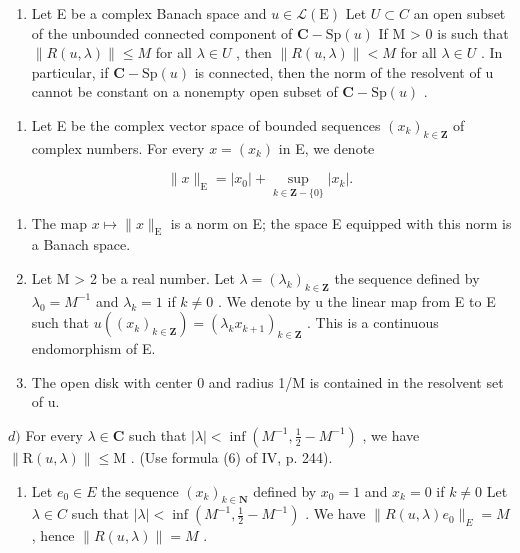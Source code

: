 \begin{enumerate}
\def\labelenumi{\alph{enumi})}
\setcounter{enumi}{1}
\tightlist
\item
  Let E be a complex Banach space and \(u \in \mathcal{L}(\mathrm{E})\) Let \(U \subset C\) an open subset of the unbounded connected component of \(\mathbf{C}-\mathrm{Sp}(u)\) If M \textgreater{} 0 is such that \(\|R(u, \lambda)\| \leqslant M\) for all \(\lambda \in U\) , then \(\|R(u, \lambda)\| < M\) for all \(\lambda \in U\) . In particular, if \(\mathbf{C}-\mathrm{Sp}(u)\) is connected, then the norm of the resolvent of u cannot be constant on a nonempty open subset of \(\mathbf{C}-\mathrm{Sp}(u)\) .
\end{enumerate}

\begin{enumerate}
\def\labelenumi{\arabic{enumi})}
\setcounter{enumi}{17}
\tightlist
\item
  Let E be the complex vector space of bounded sequences \((x_{k})_{k\in\mathbf{Z}}\) of complex numbers. For every \(x=(x_{k})\) in E, we denote
\end{enumerate}

\[
\| x \| _ {\mathrm{E}} = | x _ {0} | + \sup _ {k \in \mathbf {Z} - \{0 \}} | x _ {k} |.
\]

\begin{enumerate}
\def\labelenumi{\alph{enumi})}
\item
  The map \(x \mapsto \|x\|_{\mathrm{E}}\) is a norm on E; the space E equipped with this norm is a Banach space.
\item
  Let M \textgreater{} 2 be a real number. Let \(\lambda = (\lambda_k)_{k \in \mathbf{Z}}\) the sequence defined by \(\lambda_0 = M^{-1}\) and \(\lambda_k = 1\) if \(k \neq 0\) . We denote by u the linear map from E to E such that \(u((x_k)_{k \in \mathbf{Z}}) = (\lambda_k x_{k+1})_{k \in \mathbf{Z}}\) . This is a continuous endomorphism of E.
\item
  The open disk with center 0 and radius 1/M is contained in the resolvent set of u.
\end{enumerate}

\(d)\) For every \(\lambda\in\mathbf{C}\) such that \(|\lambda|<\inf(M^{-1},\frac{1}{2}-M^{-1})\) , we have \(\|\mathrm{R}(u,\lambda)\|\leqslant\mathrm{M}\) . (Use formula (6) of IV, p. 244).

\begin{enumerate}
\def\labelenumi{\alph{enumi})}
\setcounter{enumi}{4}
\tightlist
\item
  Let \(e_{0} \in E\) the sequence \((x_{k})_{k \in \mathbf{N}}\) defined by \(x_{0} = 1\) and \(x_{k} = 0\) if \(k \neq 0\) Let \(\lambda \in C\) such that \(|\lambda| < \inf(M^{-1}, \frac{1}{2} - M^{-1})\) . We have \(\|R(u, \lambda)e_{0}\|_{E} = M\) , hence \(\|R(u, \lambda)\| = M\) .
\end{enumerate}

